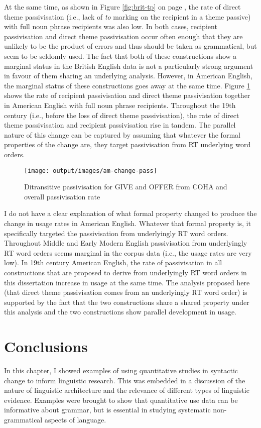 	At the same time, as shown in Figure \ref{fig:brit-tp} on page \pageref{fig:brit-tp}, the rate of direct theme passivisation (i.e., lack of \textit{to} marking on the recipient in a theme passive) with full noun phrase recipients was also low. In both cases, recipient passivisation and direct theme passivisation occur often enough that they are unlikely to be the product of errors and thus should be taken as grammatical, but seem to be seldomly used. The fact that both of these constructions show a marginal status in the British English data is not a particularly strong argument in favour of them sharing an underlying analysis. However, in American English, the marginal status of these constructions goes away at the same time. Figure \ref{fig:am-change-pass} shows the rate of recipient passivisation and direct theme passivisation together in American English with full noun phrase recipients. Throughout the 19th century (i.e., before the loss of direct theme passivisation), the rate of direct theme passivisation and recipient passivisation rise in tandem. The parallel nature of this change can be captured by assuming that whatever the formal properties of the change are, they target passivisation from RT underlying word orders.

	\begin{figure}[ht!]
		\texttt{[image: output/images/am-change-pass]}
		\caption{Ditransitive passivisation for GIVE and OFFER from COHA and overall passivisation rate}
		\label{fig:am-change-pass}
	\end{figure}

	I do not have a clear explanation of what formal property changed to produce the change in usage rates in American English. Whatever that formal property is, it specifically targeted the passivisation from underlyingly RT word orders. Throughout Middle and Early Modern English passivisation from underlyingly RT word orders seems marginal in the corpus data (i.e., the usage rates are very low). In 19th century American English, the rate of passivisation in all constructions that are proposed to derive from underlyingly RT word orders in this dissertation increase in usage at the same time. The analysis proposed here (that direct theme passivisation comes from an underlyingly RT word order) is supported by the fact that the two constructions share a shared property under this analysis and the two constructions show parallel development in usage.


\section{Conclusions}
	In this chapter, I showed examples of using quantitative studies in syntactic change to inform linguistic research. This was embedded in a discussion of the nature of linguistic architecture and the relevance of different types of linguistic evidence. Examples were brought to show that quantitative use data can be informative about grammar, but is essential in studying systematic non-grammatical aspects of language.
	
